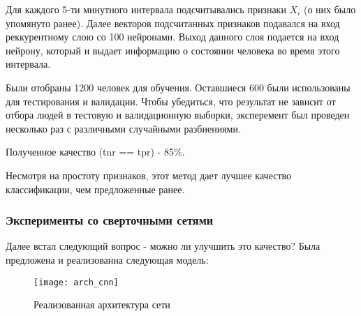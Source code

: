 Для каждого 5-ти минутного интервала подсчитывались признаки $X_i$ (о них было упомянуто ранее). Далее векторов подсчитанных признаков подавался на вход реккурентному слою со 100 нейронами. Выход данного слоя подается на вход нейрону, который и выдает информацию о состоянии человека во время этого интервала. 

Были отобраны 1200 человек для обучения. Оставшиеся 600 были использованы для тестирования и валидации. 
Чтобы убедиться, что результат не зависит от отбора людей в тестовую и валидационную выборки, эксперемент был проведен несколько раз с различными случайными разбиениями.

Полученное качество (tnr == tpr) - 85\%. 

Несмотря на простоту признаков, этот метод дает лучшее качество классификации, чем предложенные ранее. 

\subsubsection{Эксперименты со сверточными сетями}

Далее встал следующий вопрос - можно ли улучшить это качество? Была предложена и реализованна следующая модель:

\begin{figure}[h]
	\begin{center}
		\texttt{[image: arch\_cnn]}
		\caption{Реализованная архитектура сети}
		\label{ris:arh}
	\end{center}
\end{figure}





